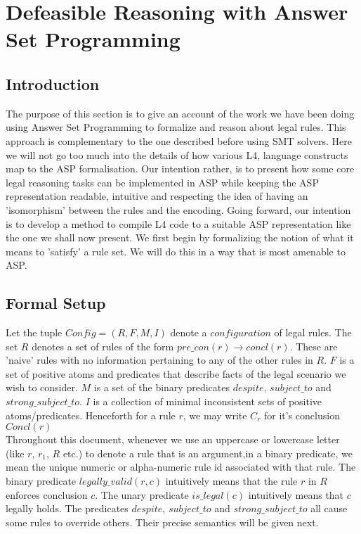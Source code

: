 \section{Defeasible Reasoning with Answer Set Programming}\label{sec:defeasible_asp}



\subsection{Introduction}
The purpose of this section is to give an account of the work we have been doing using Answer Set Programming to formalize and reason about legal rules. This approach is complementary to the one described before using SMT solvers. Here we will not go too much into the details of how various L4, language constructs map to the ASP formalisation. Our intention rather, is to present how some core legal reasoning tasks can be implemented in ASP while keeping the ASP representation readable, intuitive and respecting the idea of having an 'isomorphism' between the rules and the encoding. Going forward, our intention is to develop a method to compile L4 code to a suitable ASP representation like the one we shall now present. We first begin by formalizing the notion of what it means to 'satisfy' a rule set. We will do this in a way that is most amenable to ASP.
\subsection{Formal Setup}
Let the tuple $Config = (R,F,M,I)$ denote a $configuration$ of legal rules. The set $R$ denotes a set of rules of the form $pre\_con(r)\rightarrow concl(r)$. These are 'naive' rules with no information pertaining to any of the other rules in $R$. $F$ is a set of positive atoms and predicates that describe facts of the legal scenario we wish to consider. $M$ is a set of the binary predicates $despite$, $subject\_to$ and $strong\_subject\_to$. $I$ is a collection of minimal inconsistent sets of positive atoms/predicates. Henceforth for a rule $r$, we may write $C_{r}$ for it's conclusion $Concl(r)$ \\
\newline
Throughout this document, whenever we use an uppercase or lowercase letter (like $r$, $r_{1}$, $R$ etc.) to denote a rule that is an argument,in a binary predicate, we mean the unique numeric or alpha-numeric rule id associated with that rule. The binary predicate $legally\_valid(r,c)$ intuitively means that the rule $r$ in $R$ enforces conclusion $c$. The unary predicate $is\_legal(c)$ intuitively means that $c$ legally holds. The predicates $despite$, $subject\_to$ and $strong\_subject\_to$ all cause some rules to override others. Their precise semantics will be given next.
